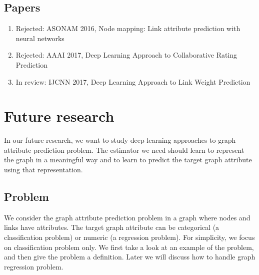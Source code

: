 \documentclass{article}
\begin{document}
\subsection{Papers}
\begin{enumerate}
	\item Rejected: ASONAM 2016, Node mapping: Link attribute prediction with neural networks
	\item Rejected: AAAI 2017, Deep Learning Approach to Collaborative Rating Prediction
	\item In review: IJCNN 2017, Deep Learning Approach to Link Weight Prediction
\end{enumerate}

\section{Future research}
In our future research,
we want to study deep learning approaches to graph attribute prediction problem.
The estimator we need should learn to represent the graph in a meaningful way
and to learn to predict the target graph attribute using that representation.

\subsection{Problem}
We consider the graph attribute prediction problem
in a graph where nodes and links have attributes.
The target graph attribute can be
categorical (a classification problem) or numeric (a regression problem).
For simplicity, we focus on classification problem only.
We first take a look at an example of the problem,
and then give the problem a definition.
Later we will discuss how to handle graph regression problem.
\end{document}
